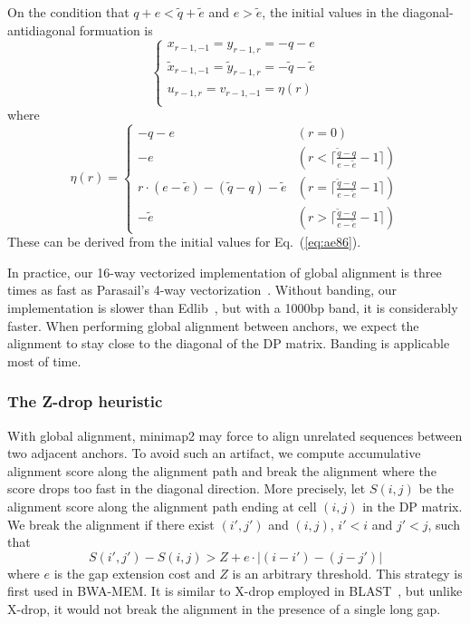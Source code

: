\documentclass{bioinfo}
\begin{document}
\begin{methods}
On the condition that $q+e<\tilde{q}+\tilde{e}$ and $e>\tilde{e}$, the initial
values in the diagonal-antidiagonal formuation is
\[
\left\{\begin{array}{l}
x_{r-1,-1}=y_{r-1,r}=-q-e\\
\tilde{x}_{r-1,-1}=\tilde{y}_{r-1,r}=-\tilde{q}-\tilde{e}\\
u_{r-1,r}=v_{r-1,-1}=\eta(r)\\
\end{array}\right.
\]
where
\[
\eta(r)=\left\{\begin{array}{ll}
-q-e & (r=0) \\
-e & (r<\lceil\frac{\tilde{q}-q}{e-\tilde{e}}-1\rceil) \\
r\cdot(e-\tilde{e})-(\tilde{q}-q)-\tilde{e} & (r=\lceil\frac{\tilde{q}-q}{e-\tilde{e}}-1\rceil) \\
-\tilde{e} & (r>\lceil\frac{\tilde{q}-q}{e-\tilde{e}}-1\rceil)
\end{array}\right.
\]
These can be derived from the initial values for Eq.~(\ref{eq:ae86}).

In practice, our 16-way vectorized implementation of global alignment is three
times as fast as Parasail's 4-way vectorization~\citep{Daily:2016aa}.  Without
banding, our implementation is slower than Edlib~\citep{Sosic:2017aa}, but with
a 1000bp band, it is considerably faster. When performing global alignment
between anchors, we expect the alignment to stay close to the diagonal of the
DP matrix. Banding is applicable most of time.

\subsubsection{The Z-drop heuristic}

With global alignment, minimap2 may force to align unrelated sequences between
two adjacent anchors. To avoid such an artifact, we compute accumulative
alignment score along the alignment path and break the alignment where the
score drops too fast in the diagonal direction. More precisely, let $S(i,j)$ be
the alignment score along the alignment path ending at cell $(i,j)$ in the DP
matrix. We break the alignment if there exist $(i',j')$ and $(i,j)$, $i'<i$ and
$j'<j$, such that
\[
S(i',j')-S(i,j)>Z+e\cdot|(i-i')-(j-j')|
\]
where $e$ is the gap extension cost and $Z$ is an arbitrary threshold.
This strategy is first used in BWA-MEM. It is similar to X-drop employed in
BLAST~\citep{Altschul:1997vn}, but unlike X-drop, it would not break the
alignment in the presence of a single long gap.


\end{methods}
\end{document}
